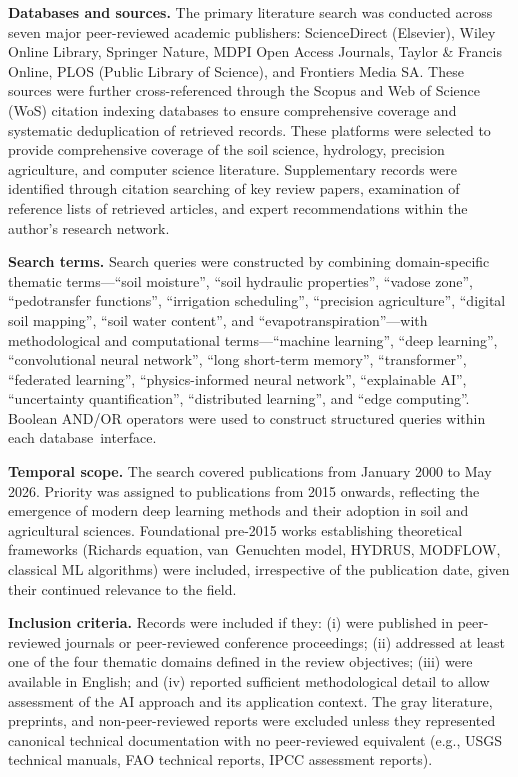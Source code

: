 \documentclass[land,review,accept,pdftex,oneauthor]{Definitions/mdpi}
\begin{document}
{\textbf{Databases and sources. %
} The primary literature search was conducted across seven major peer-reviewed academic publishers: ScienceDirect (Elsevier), Wiley Online Library, Springer Nature, MDPI Open Access Journals, Taylor \& Francis Online, PLOS (Public Library of Science), and Frontiers Media SA. These sources were further cross-referenced through the Scopus and Web of Science (WoS) citation indexing databases to ensure comprehensive coverage and systematic deduplication of retrieved records. These platforms were selected to provide comprehensive coverage of the soil science, hydrology, precision agriculture, and computer science literature. Supplementary records were identified through citation searching of key review papers, examination of reference lists of retrieved articles, and expert recommendations within the author's research network.}

{\textbf{Search terms.} Search queries were constructed by combining domain-specific thematic terms---``soil moisture'', ``soil hydraulic properties'', ``vadose zone'', ``pedotransfer functions'', ``irrigation scheduling'', ``precision agriculture'', ``digital soil mapping'', ``soil water content'', and ``evapotranspiration''---with methodological and computational terms---``machine learning'', ``deep learning'', ``convolutional neural network'', ``long short-term memory'', ``transformer'', ``federated learning'', ``physics-informed neural network'', ``explainable AI'', ``uncertainty quantification'', ``distributed learning'', and ``edge computing''. Boolean AND/OR operators were used to construct structured queries within each database~interface.}

{\textbf{Temporal scope.} The search covered publications from January 2000 to May 2026. Priority was assigned to publications from 2015 onwards, reflecting the emergence of modern deep learning methods and their adoption in soil and agricultural sciences. Foundational pre-2015 works establishing theoretical frameworks (Richards equation, van~Genuchten model, HYDRUS, MODFLOW, classical ML algorithms) were included, irrespective of the publication date, given their continued relevance to the field.}

{\textbf{Inclusion criteria.} Records were included if they: (i) were published in peer-reviewed journals or peer-reviewed conference proceedings; (ii) addressed at least one of the four thematic domains defined in the review objectives; (iii) were available in English; and (iv) reported sufficient methodological detail to allow assessment of the AI approach and its application context. The gray literature, preprints, and non-peer-reviewed reports were excluded unless they represented canonical technical documentation with no peer-reviewed equivalent (e.g., USGS technical manuals, FAO technical reports, IPCC assessment reports).}
\end{document}
